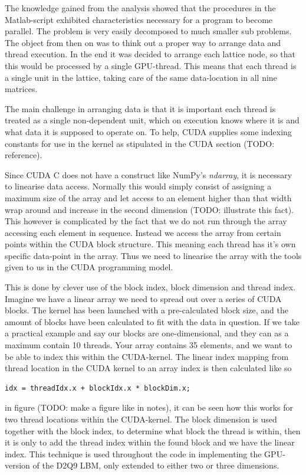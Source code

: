 The knowledge gained from the analysis showed that the procedures in the Matlab-script exhibited characteristics necessary for a program to become parallel. The problem is very easily decomposed to much smaller sub problems. The object from then on was to think out a proper way to arrange data and thread execution. In the end it was decided to arrange each lattice node, so that this would be processed by a single GPU-thread. This means that each thread is a single unit in the lattice, taking care of the same data-location in all nine matrices.

The main challenge in arranging data is that it is important each thread is treated as a single non-dependent unit, which on execution knows where it is and what data it is supposed to operate on. To help, CUDA supplies some indexing constants for use in the kernel as stipulated in the CUDA section (TODO: reference).

Since CUDA C does not have a construct like NumPy's \textit{ndarray}, it is necessary to linearise data access. Normally this would simply consist of assigning a maximum size of the array and let access to an element higher than that width wrap around and increase in the second dimension (TODO: illustrate this fact). This however is complicated by the fact that we do not run through the array accessing each element in sequence. Instead we access the array from certain points within the CUDA block structure. This meaning each thread has it's own specific data-point in the array. Thus we need to linearise the array with the tools given to us in the CUDA programming model.

This is done by clever use of the block index, block dimension and thread index. Imagine we have a linear array we need to spread out over a series of CUDA blocks. The kernel has been launched with a pre-calculated block size, and the amount of blocks have been calculated to fit with the data in question. If we take a practical example and say our blocks are one-dimensional, and they can as a maximum contain 10 threads. Your array contains 35 elements, and we want to be able to index this within the CUDA-kernel. The linear index mapping from thread location in the CUDA kernel to an array index is then calculated like so

\begin{verbatim}
idx = threadIdx.x + blockIdx.x * blockDim.x;
\end{verbatim}

in figure (TODO: make a figure like in notes), it can be seen how this works for two thread locations within the CUDA-kernel. The block dimension is used together with the block index, to determine what block the thread is within, then it is only to add the thread index within the found block and we have the linear index. This technique is used throughout the code in implementing the GPU-version of the D2Q9 LBM, only extended to either two or three dimensions.

